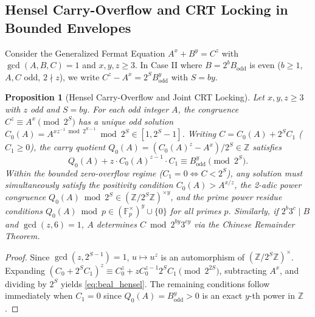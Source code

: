\documentclass[11pt, a4paper]{amsart}
\newtheorem{proposition}[theorem]{Proposition}
\theoremstyle{definition}
\newcommand{\Z}{\mathbb{Z}}
\newcommand{\F}{\mathbb{F}}
\begin{document}
\subsection{Hensel Carry-Overflow and CRT Locking in Bounded Envelopes}
Consider the Generalized Fermat Equation $A^x + B^y = C^z$ with $\gcd(A,B,C) = 1$ and $x, y, z \ge 3$. In Case II where $B = 2^b B_{\text{odd}}$ is even ($b \ge 1$, $A, C$ odd, $2 \nmid z$), we write $C^z - A^x = 2^S B_{\text{odd}}^y$ with $S = by$.

\begin{proposition}[Hensel Carry-Overflow and Joint CRT Locking]\label{prop:beal_hensel}
Let $x, y, z \ge 3$ with $z$ odd and $S = by$. For each odd integer $A$, the congruence $C^z \equiv A^x \pmod{2^S}$ has a unique odd solution $C_0(A) = A^{x z^{-1} \bmod 2^{S-1}} \bmod 2^S \in [1, 2^S - 1]$. Writing $C = C_0(A) + 2^S C_1$ ($C_1 \ge 0$), the carry quotient $Q_0(A) = (C_0(A)^z - A^x)/2^S \in \Z$ satisfies
\begin{equation}\label{eq:beal_hensel}
Q_0(A) + z \cdot C_0(A)^{z-1} \cdot C_1 \equiv B_{\text{odd}}^y \pmod{2^S}.
\end{equation}
Within the bounded zero-overflow regime ($C_1 = 0 \iff C < 2^S$), any solution must simultaneously satisfy the positivity condition $C_0(A) > A^{x/z}$, the 2-adic power congruence $Q_0(A) \bmod 2^S \in (\Z/2^S\Z)^{\times y}$, and the prime power residue conditions $Q_0(A) \bmod p \in (\F_p^\times)^y \cup \{0\}$ for all primes $p$. Similarly, if $2^b 3^c \mid B$ and $\gcd(z, 6) = 1$, $A$ determines $C \bmod 2^{by} 3^{cy}$ via the Chinese Remainder Theorem.
\end{proposition}

\begin{proof}
Since $\gcd(z, 2^{S-1}) = 1$, $u \mapsto u^z$ is an automorphism of $(\Z/2^S\Z)^\times$. Expanding $(C_0 + 2^S C_1)^z \equiv C_0^z + z C_0^{z-1} 2^S C_1 \pmod{2^{2S}}$, subtracting $A^x$, and dividing by $2^S$ yields \eqref{eq:beal_hensel}. The remaining conditions follow immediately when $C_1 = 0$ since $Q_0(A) = B_{\text{odd}}^y > 0$ is an exact $y$-th power in $\Z$.
\end{proof}
\end{document}
